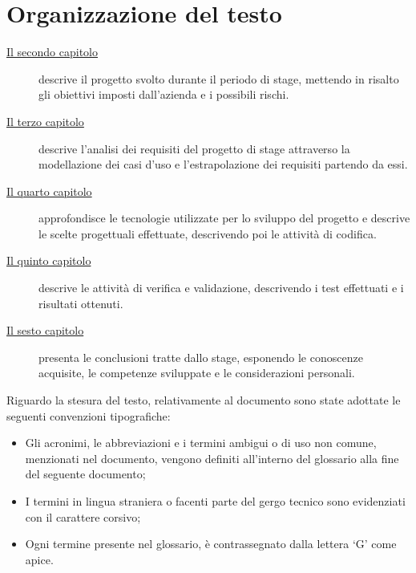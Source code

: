 \section{Organizzazione del testo}
\begin{description}
    \item[{\hyperref[cap:descrizione-stage]{Il secondo capitolo}}] descrive il progetto svolto durante il periodo di stage, mettendo in risalto gli obiettivi imposti dall'azienda e i possibili rischi.
    \item[{\hyperref[cap:analisi-requisiti]{Il terzo capitolo}}] descrive l'analisi dei requisiti del progetto di stage attraverso la modellazione dei casi d'uso e l'estrapolazione dei requisiti partendo da essi.
    \item[{\hyperref[cap:progettazione-codifica]{Il quarto capitolo}}] approfondisce le tecnologie utilizzate per lo sviluppo del progetto e descrive le scelte progettuali effettuate, descrivendo poi le attività di codifica.
    \item[{\hyperref[cap:verifica-validazione]{Il quinto capitolo}}] descrive le attività di verifica e validazione, descrivendo i test effettuati e i risultati ottenuti.
    \item[{\hyperref[cap:conclusioni]{Il sesto capitolo}}] presenta le conclusioni tratte dallo stage, esponendo le conoscenze acquisite, le competenze sviluppate e le considerazioni personali. 
\end{description}

\clearpage

Riguardo la stesura del testo, relativamente al documento sono state adottate le seguenti convenzioni tipografiche:
\begin{itemize}
  \item Gli acronimi, le abbreviazioni e i termini ambigui o di uso non comune, menzionati nel documento, vengono definiti all'interno del glossario alla fine del seguente documento;
  \item I termini in lingua straniera o facenti parte del gergo tecnico sono evidenziati con il carattere corsivo;
  \item Ogni termine presente nel glossario, è contrassegnato dalla lettera `G' come apice.
\end{itemize}
